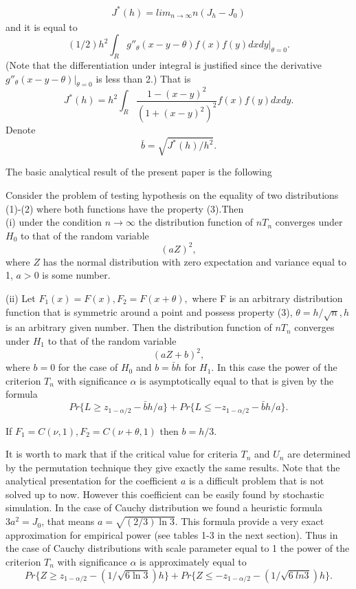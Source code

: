 \documentclass{svproc}
\begin{document}
\begin{eqnarray}
J^*(h)= lim_{n\to \infty} n(J_h - J_0)
\end{eqnarray}
and it is equal to
$$
(1/2)h^2 \int_R g''_\theta(x-y-\theta)f(x)f(y)dxdy|_{\theta=0}.
$$
(Note that the differentiation under integral is justified since the derivative $g ''_\theta(x-y-\theta)|_{\theta=0}$ is less than 2.)
That is
$$
J^*(h)=h^2 \int_R \frac {1-(x-y)^2}{(1+(x-y)^2)^2} f(x)f(y)dxdy.
$$
Denote
$$
\bar b =\sqrt{J^*(h)/h^2}.
$$

The basic analytical result of the present paper is the following
\begin{theorem} Consider the problem of testing hypothesis on the equality of two distributions (1)-(2) where both functions have the property (3).Then\\
(i) under the condition $n \to \infty$
the distribution function of $nT_n$  converges under $H_0$ to that of the random variable
\begin{equation}\label{Distr}
(aZ)^2,
\end{equation}
where  $Z$ has the normal distribution with zero expectation and variance equal to 1, $a>0$ is some number.

(ii)
Let $F_1(x)= F(x),F_2=F(x+\theta),$
where  F is an arbitrary distribution function that is symmetric around a point and possess property   (3),
$\theta=h/\sqrt{n},h$ is an arbitrary given number. Then
the distribution function of $nT_n$  converges under $H_1$ to that of the random variable
$$
(aZ + b)^2,
$$
where $ b=0$
for the case of $H_0$ and $b=\bar b h$
for  $H_1$.
In this case the power of the criterion $T_n$ with significance $\alpha$ is asymptotically equal to that is given by the formula
$$
Pr\{L\geq z_{1-\alpha/2}-\bar bh/a\}
+ Pr\{L\leq - z_{1-\alpha/2}-\bar bh/a\}.
$$

If $F_1=C(\nu,1), F_2=C(\nu + \theta,1)$ then $ b= h/3$. 
\end{theorem}
It is worth to mark that if the critical value for criteria $T_n$ and $U_n$ are determined by the permutation technique they give exactly the same results.
Note that the analytical presentation for the coefficient $a$ is a difficult problem that is not solved up to now. However this coefficient can be easily found by stochastic simulation. In the case of Cauchy distribution we found a heuristic formula $3a^2= J_0$, that means $a =\sqrt{(2/3)\ln3}$. This formula provide a very exact approximation for empirical power (see tables 1-3 in the next section). 
Thus in the case of Cauchy distributions with scale parameter equal to 1  the power of the criterion $T_n$ with significance $\alpha$ is approximately equal to
$$
Pr\{Z\geq z_{1-\alpha/2}-(1/\sqrt{6\ln 3})h\}
+ Pr\{Z\leq - z_{1-\alpha/2}-(1/\sqrt{6\
ln 3})h\}.
$$
\end{document}
